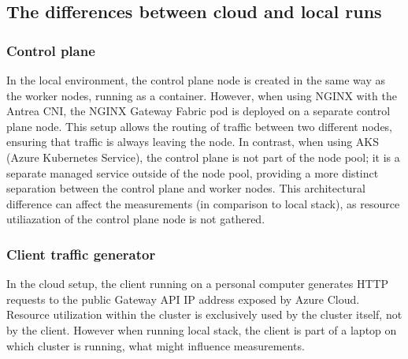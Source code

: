\subsection{The differences between cloud and local runs}
\label{sec:diff}

\subsubsection{Control plane}
\label{sec:cplaneDiff}

In the local environment, the control plane node is created in the same way as the worker nodes, running as a container. However, when using NGINX with the Antrea CNI, the NGINX Gateway Fabric pod is deployed on a separate control plane node. This setup allows the routing of traffic between two different nodes, ensuring that traffic is always leaving the node. In contrast, when using AKS (Azure Kubernetes Service), the control plane is not part of the node pool; it is a separate managed service outside of the node pool, providing a more distinct separation between the control plane and worker nodes. This architectural difference can affect the measurements (in comparison to local stack), as resource utiliazation of the control plane node is not gathered.

\subsubsection{Client traffic generator}
\label{sec:clientServerDiff}

In the cloud setup, the client running on a personal computer generates HTTP requests to the public Gateway API IP address exposed by Azure Cloud. Resource utilization within the cluster is exclusively used by the cluster itself, not by the client. However when running local stack, the client is part of a laptop on which cluster is running, what might influence measurements.
